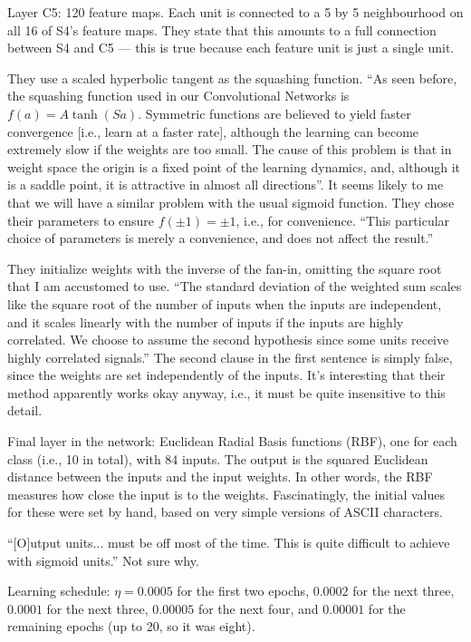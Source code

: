\documentclass[12pt]{report}
\begin{document}
Layer C5: 120 feature maps.  Each unit is connected to a 5 by 5
neighbourhood on all 16 of S4's feature maps.  They state that this
amounts to a full connection between S4 and C5 --- this is true
because each feature unit is just a single unit.

They use a scaled hyperbolic tangent as the squashing function.  ``As
seen before, the squashing function used in our Convolutional Networks
is $f(a) = A \tanh(Sa)$.  Symmetric functions are believed to yield
faster convergence [i.e., learn at a faster rate], although the
learning can become extremely slow if the weights are too small.  The
cause of this problem is that in weight space the origin is a fixed
point of the learning dynamics, and, although it is a saddle point, it
is attractive in almost all directions''. It seems likely to me that
we will have a similar problem with the usual sigmoid function.  They
chose their parameters to ensure $f(\pm 1) = \pm 1$, i.e., for
convenience.  ``This particular choice of parameters is merely a
convenience, and does not affect the result.''

They initialize weights with the inverse of the fan-in, omitting the
square root that I am accustomed to use.  ``The standard deviation of
the weighted sum scales like the square root of the number of inputs
when the inputs are independent, and it scales linearly with the
number of inputs if the inputs are highly correlated.  We choose to
assume the second hypothesis since some units receive highly
correlated signals.''  The second clause in the first sentence is
simply false, since the weights are set independently of the inputs.
It's interesting that their method apparently works okay anyway, i.e.,
it must be quite insensitive to this detail.

Final layer in the network: Euclidean Radial Basis functions (RBF),
one for each class (i.e., 10 in total), with 84 inputs.  The output is
the squared Euclidean distance between the inputs and the input
weights.  In other words, the RBF measures how close the input is to
the weights.  Fascinatingly, the initial values for these were set by
hand, based on very simple versions of ASCII characters.

``[O]utput units... must be off most of the time.  This is quite
difficult to achieve with sigmoid units.''  Not sure why. 

Learning schedule: $\eta = 0.0005$ for the first two epochs, $0.0002$
for the next three, $0.0001$ for the next three, $0.00005$ for the
next four, and $0.00001$ for the remaining epochs (up to 20, so it was
eight).
\end{document}
